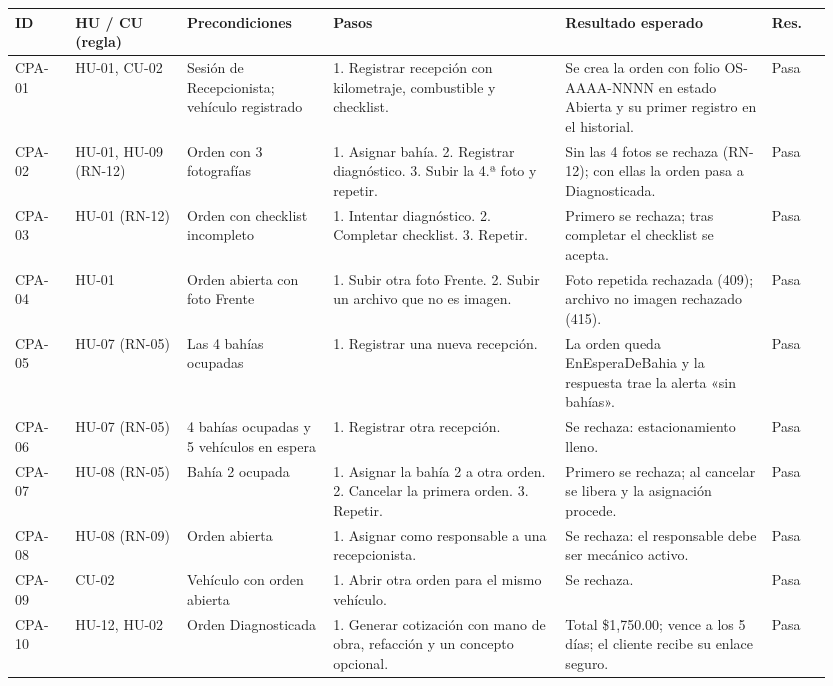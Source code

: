 {\footnotesize
\begin{longtable}{@{}L{0.07\linewidth}L{0.13\linewidth}L{0.17\linewidth}L{0.27\linewidth}L{0.24\linewidth}L{0.07\linewidth}@{}}
\toprule
\textbf{ID} & \textbf{HU / CU (regla)} & \textbf{Precondiciones} & \textbf{Pasos} & \textbf{Resultado esperado} & \textbf{Res.} \\
\midrule
\endhead
\bottomrule
\endlastfoot
CPA-01 & HU-01, CU-02 & Sesión de Recepcionista; vehículo registrado & 1. Registrar recepción con kilometraje, combustible y checklist. & Se crea la orden con folio OS-AAAA-NNNN en estado Abierta y su primer registro en el historial. & Pasa \\
CPA-02 & HU-01, HU-09 (RN-12) & Orden con 3 fotografías & 1. Asignar bahía. 2. Registrar diagnóstico. 3. Subir la 4.ª foto y repetir. & Sin las 4 fotos se rechaza (RN-12); con ellas la orden pasa a Diagnosticada. & Pasa \\
CPA-03 & HU-01 (RN-12) & Orden con checklist incompleto & 1. Intentar diagnóstico. 2. Completar checklist. 3. Repetir. & Primero se rechaza; tras completar el checklist se acepta. & Pasa \\
CPA-04 & HU-01 & Orden abierta con foto Frente & 1. Subir otra foto Frente. 2. Subir un archivo que no es imagen. & Foto repetida rechazada (409); archivo no imagen rechazado (415). & Pasa \\
CPA-05 & HU-07 (RN-05) & Las 4 bahías ocupadas & 1. Registrar una nueva recepción. & La orden queda EnEsperaDeBahia y la respuesta trae la alerta «sin bahías». & Pasa \\
CPA-06 & HU-07 (RN-05) & 4 bahías ocupadas y 5 vehículos en espera & 1. Registrar otra recepción. & Se rechaza: estacionamiento lleno. & Pasa \\
CPA-07 & HU-08 (RN-05) & Bahía 2 ocupada & 1. Asignar la bahía 2 a otra orden. 2. Cancelar la primera orden. 3. Repetir. & Primero se rechaza; al cancelar se libera y la asignación procede. & Pasa \\
CPA-08 & HU-08 (RN-09) & Orden abierta & 1. Asignar como responsable a una recepcionista. & Se rechaza: el responsable debe ser mecánico activo. & Pasa \\
CPA-09 & CU-02 & Vehículo con orden abierta & 1. Abrir otra orden para el mismo vehículo. & Se rechaza. & Pasa \\
CPA-10 & HU-12, HU-02 & Orden Diagnosticada & 1. Generar cotización con mano de obra, refacción y un concepto opcional. & Total \$1,750.00; vence a los 5 días; el cliente recibe su enlace seguro. & Pasa \\

\end{longtable}}
